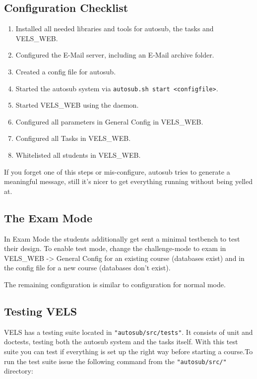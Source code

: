 \subsection{Configuration Checklist} \label{sub:configChecklist}

\begin{enumerate}
\item Installed all needed libraries and tools for autosub, the tasks and VELS\_WEB.
\item Configured the E-Mail server, including an E-Mail archive folder.
\item Created a config file for autosub.
\item Started the autosub system via {\tt autosub.sh start <configfile>}.
\item Started VELS\_WEB using the daemon.
\item Configured all parameters in General Config in VELS\_WEB.
\item Configured all Tasks in VELS\_WEB.
\item Whitelisted all students in VELS\_WEB.
\end{enumerate}

If you forget one of this steps or mis-configure, autosub tries to generate a meaningful
message, still it's nicer to get everything running without being yelled at.

\subsection{The Exam Mode}\label{sub:exammode}
In Exam Mode the students additionally get sent a minimal testbench to test their design.
To enable test mode, change the challenge-mode to exam in VELS\_WEB -> General Config for
an existing course (databases exist) and in the config file for a new course (databases
don't exist).

The remaining configuration is similar to configuration for normal mode.

\subsection{Testing VELS}\label{sub:testingvels}


VELS has a testing suite located in {\tt "autosub/src/tests"}. It consists of unit and
doctests, testing both the autosub system and the tasks itself. With this test suite you
can test if everything is set up the right way before starting a course.To run the test
suite issue the following command from the {\tt "autosub/src/"} directory:

